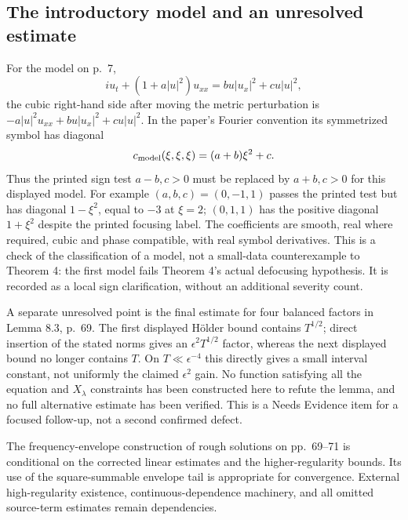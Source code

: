 \documentclass[10pt]{article}
\begin{document}
\subsection*{The introductory model and an unresolved estimate}
For the model on p. 7, \[iu_t+(1+a|u|^2)u_{xx}=bu|u_x|^2+cu|u|^2,\] the cubic right-hand side after moving the metric perturbation is \(-a|u|^2u_{xx}+bu|u_x|^2+cu|u|^2\). In the paper’s Fourier convention its symmetrized symbol has diagonal \[c_{\rm model}(\xi,\xi,\xi)=(a+b)\xi^2+c.\] Thus the printed sign test \(a-b,c>0\) must be replaced by \(a+b,c>0\) for this displayed model. For example \((a,b,c)=(0,-1,1)\) passes the printed test but has diagonal \(1-\xi^2\), equal to \(-3\) at \(\xi=2\); \((0,1,1)\) has the positive diagonal \(1+\xi^2\) despite the printed focusing label. The coefficients are smooth, real where required, cubic and phase compatible, with real symbol derivatives. This is a check of the classification of a model, not a small-data counterexample to Theorem 4: the first model fails Theorem 4’s actual defocusing hypothesis. It is recorded as a local sign clarification, without an additional severity count.\par
A separate unresolved point is the final estimate for four balanced factors in Lemma 8.3, p. 69. The first displayed Hölder bound contains \(T^{1/2}\); direct insertion of the stated norms gives an \(\epsilon^2T^{1/2}\) factor, whereas the next displayed bound no longer contains \(T\). On \(T\ll\epsilon^{-4}\) this directly gives a small interval constant, not uniformly the claimed \(\epsilon^2\) gain. No function satisfying all the equation and \(X_\lambda\) constraints has been constructed here to refute the lemma, and no full alternative estimate has been verified. This is a Needs Evidence item for a focused follow-up, not a second confirmed defect.\par
The frequency-envelope construction of rough solutions on pp. 69–71 is conditional on the corrected linear estimates and the higher-regularity bounds. Its use of the square-summable envelope tail is appropriate for convergence. External high-regularity existence, continuous-dependence machinery, and all omitted source-term estimates remain dependencies.\par
\end{document}

